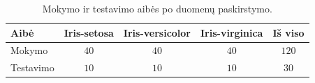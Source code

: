 \begin{table}[H]
    \centering
    \caption{Mokymo ir testavimo aibės po duomenų paskirstymo.}
    \begin{tabular}{|l|c|c|c|c|}
        \hline
        \textbf{Aibė} & \textbf{Iris-setosa} & \textbf{Iris-versicolor} & \textbf{Iris-virginica} & \textbf{Iš viso} \\
        \hline
        Mokymo   & $40$ & $40$ & $40$ & $120$ \\ \hline
        Testavimo & $10$ & $10$ & $10$ & $30$  \\ \hline
    \end{tabular}
    \label{tab:paskirstytos_aibes}
\end{table}